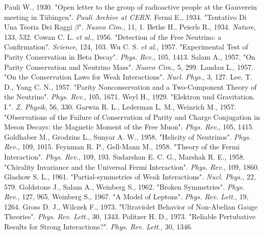 \documentclass[english]{article}
\begin{document}
\clearpage    
\begin{thebibliography}{99}

    Pauli W., 1930. "Open letter to the group of radioactive people at the Gauverein meeting in T\"{u}bingen". \textit{Pauli Archive at CERN}.
    Fermi E., 1934. "Tentativo Di Una Teoria Dei Raggi $\beta$". \textit{Nuovo Cim.}, 11, 1.
    Bethe H., Peierls R., 1934. \textit{Nature}, 133, 532.
    Cowan C. L. \textit{et al.}, 1956. "Detection of the Free Neutrino: a Confirmation". \textit{Science}, 124, 103.
    Wu C. S. \textit{et al.}, 1957. "Experimental Test of Parity Conservation in Beta Decay". \textit{Phys. Rev.}, 105, 1413.
    Salam A., 1957. "On Parity Conservation and Neutrino Mass". \textit{Nuovo Cim.}, 5, 299.
    Landau L., 1957. "On the Conservation Laws for Weak Interactions". \textit{Nucl. Phys.}, 3, 127.
    Lee. T. D., Yang C. N., 1957. "Parity Nonconservation and a Two-Component Theory of the Neutrino". \textit{Phys. Rev.}, 105, 1671.
    Weyl H., 1929. "Elektron und Gravitation. I.". \textit{Z. Physik}, 56, 330.
    Garwin R. L., Lederman L. M., Weinrich M., 1957. "Observations of the Failure of Conservation of Parity and Charge Conjugation in Meson Decays: the Magnetic Moment of the Free Muon". \textit{Phys. Rev.}, 105, 1415.
    Goldhaber M., Grodzins L., Sunyar A. W., 1958. "Helicity of Neutrinos". \textit{Phys. Rev.}, 109, 1015.
    Feynman R. P., Gell-Mann M., 1958. "Theory of the Fermi Interaction". \textit{Phys. Rev.}, 109, 193.
    Sudarshan E. C. G., Marshak R. E., 1958. "Chirality Invariance and the Universal Fermi Interaction". \textit{Phys. Rev.}, 109, 1860.
    Glashow S. L., 1961. "Partial-symmetries of Weak Interactions". \textit{Nucl. Phys.}, 22, 579.
    Goldstone J., Salam A., Weinberg S., 1962. "Broken Symmetries". \textit{Phys. Rev.}, 127, 965.
    Weinberg S., 1967. "A Model of Leptons". \textit{Phys. Rev. Lett.}, 19, 1264.
    Gross D. J., Wilczek F., 1973. "Ultraviolet Behavior of Non-Abelian Gauge Theories". \textit{Phys. Rev. Lett.}, 30, 1343.
    Politzer H. D., 1973. "Reliable Pertubative Results for Strong Interactions?". \textit{Phys. Rev. Lett.}, 30, 1346.

\end{thebibliography}
\end{document}

